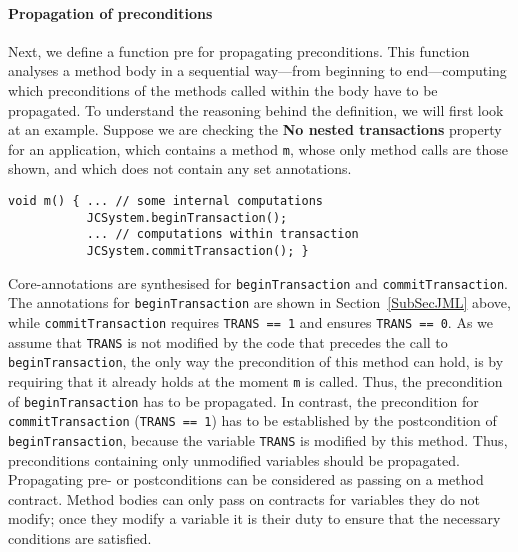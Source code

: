 \paragraph{Propagation of preconditions}
Next, we define a function \textsf{pre} for
propagating preconditions. This function analyses a
method body in a sequential way---from beginning to end---computing
which preconditions of the methods called within the body have to be
propagated. To understand the reasoning behind the definition, we will
first look at an example. Suppose we are checking the \textbf{No
nested transactions} property for an application, which contains a
method \texttt{m}, whose only method calls are those shown, and which
does not contain any set annotations.
\begin{verbatim}
void m() { ... // some internal computations
           JCSystem.beginTransaction();
           ... // computations within transaction
           JCSystem.commitTransaction(); }
\end{verbatim}
Core-annotations are synthesised for \texttt{beginTransaction}
and \texttt{commit\-Transaction}. The annotations for
\texttt{beginTransaction} are shown in Section~\ref{SubSecJML}
above, while \texttt{commitTransaction} requires \texttt{TRANS == 1}
and ensures \texttt{TRANS == 0}. As we assume that \texttt{TRANS} is
not modified by the code that precedes the call to
\texttt{beginTransaction},  the only way the precondition of this method
can hold, is by requiring that it already holds at the moment
\texttt{m} is called. Thus, the precondition of
\texttt{beginTransaction} has to be propagated. In contrast, the
precondition for \texttt{commitTransaction} (\texttt{TRANS == 1})
has to be established by the postcondition of
\texttt{begin\-Transaction}, because the variable \texttt{TRANS} is
modified by this method. %
Thus, preconditions containing only unmodified variables should be
propagated.  Propagating pre- or postconditions can be considered as
passing on a method contract. Method bodies can only pass on contracts
for variables they do not modify; once they modify a variable it is
their duty to ensure that the necessary conditions are satisfied.


